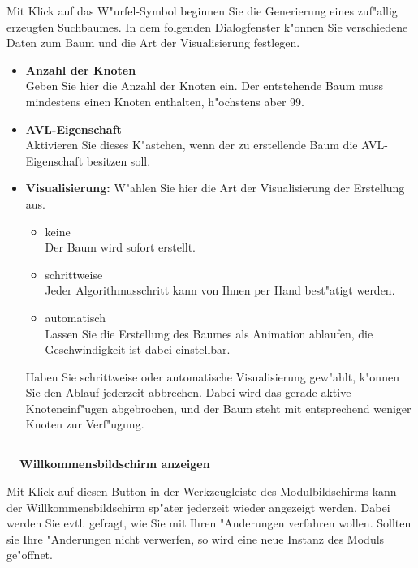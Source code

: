 Mit Klick auf das W"urfel-Symbol beginnen Sie die Generierung eines zuf"allig erzeugten Suchbaumes. In dem folgenden
Dialogfenster k"onnen Sie verschiedene Daten zum Baum und die Art der Visualisierung festlegen. 

\begin{itemize}
	\item {\bf Anzahl der Knoten} \\
	 Geben Sie hier die Anzahl der Knoten ein. Der entstehende Baum muss mindestens einen Knoten enthalten, h"ochstens aber 99. 
	\item {\bf AVL-Eigenschaft} \\
	 Aktivieren Sie dieses K"astchen, wenn der zu erstellende Baum die AVL-Eigenschaft besitzen soll.
	\item {\bf Visualisierung:} W"ahlen Sie hier die Art der Visualisierung der Erstellung aus.

	\begin{itemize}
		\item {\sc keine} \\ Der Baum wird sofort erstellt.
		\item {\sc schrittweise}\\ Jeder Algorithmusschritt kann von Ihnen per Hand best"atigt werden.
		\item {\sc automatisch}\\ Lassen Sie die Erstellung des Baumes als Animation ablaufen, die 
												Geschwindigkeit ist dabei einstellbar. 
	\end{itemize}
	Haben Sie schrittweise oder automatische Visualisierung gew"ahlt, k"onnen Sie den Ablauf jederzeit abbrechen. 
    Dabei wird das gerade aktive Knoteneinf"ugen abgebrochen, und der Baum steht mit entsprechend weniger Knoten zur Verf"ugung.
\end{itemize}
\bigskip


\subsection[Willkommensbildschirm anzeigen]{}
\vspace{-4.3ex} {\bf {\large  \qquad \quad \ \ Willkommensbildschirm anzeigen}} 


Mit Klick auf diesen Button in der Werkzeugleiste des Modulbildschirms kann der Willkommensbildschirm sp"ater jederzeit wieder
angezeigt werden. Dabei werden Sie evtl. gefragt, wie Sie mit Ihren "Anderungen verfahren wollen.  
Sollten sie Ihre "Anderungen nicht verwerfen, so wird eine neue Instanz des Moduls ge"offnet. \\

